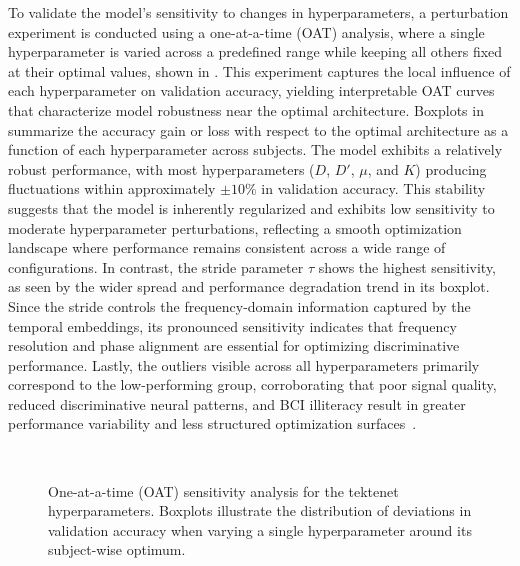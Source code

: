 To validate the model's sensitivity to changes in hyperparameters, a perturbation experiment is conducted using a one-at-a-time (OAT) analysis, where a single hyperparameter is varied across a predefined range while keeping all others fixed at their optimal values, shown in . This experiment captures the local influence of each hyperparameter on validation accuracy, yielding interpretable OAT curves that characterize model robustness near the optimal architecture. Boxplots in  summarize the accuracy gain or loss with respect to the optimal architecture as a function of each hyperparameter across subjects. The model exhibits a relatively robust performance, with most hyperparameters ($D$, $D'$, $\mu$, and $K$) producing fluctuations within approximately $\pm 10\%$ in validation accuracy. This stability suggests that the model is inherently regularized and exhibits low sensitivity to moderate hyperparameter perturbations, reflecting a smooth optimization landscape where performance remains consistent across a wide range of configurations. In contrast, the stride parameter $\tau$ shows the highest sensitivity, as seen by the wider spread and performance degradation trend in its boxplot. Since the stride controls the frequency-domain information captured by the temporal embeddings, its pronounced sensitivity indicates that frequency resolution and phase alignment are essential for optimizing discriminative performance. Lastly, the outliers visible across all hyperparameters primarily correspond to the low-performing group, corroborating that poor signal quality, reduced discriminative neural patterns, and BCI illiteracy result in greater performance variability and less structured optimization surfaces~\cite {roy2020deep, ashburner2011multivariate}.
\setlength{}
\setlength{}
\begin{figure}[H]
\centering
\tiny
\subfloat{}\hfill
\subfloat{}\hfill
\subfloat{}\\[0.6ex]

\makebox[\textwidth]{%
  \begin{minipage}{\textwidth} %
    \centering
    \subfloat{}
    \subfloat{}
  \end{minipage}%
}
\caption{One-at-a-time (OAT) sensitivity analysis for the \gls{tektenet} hyperparameters. Boxplots illustrate the distribution of deviations in validation accuracy when varying a single hyperparameter around its subject-wise optimum.}
\label{fig:boxplots:all}
\end{figure}

